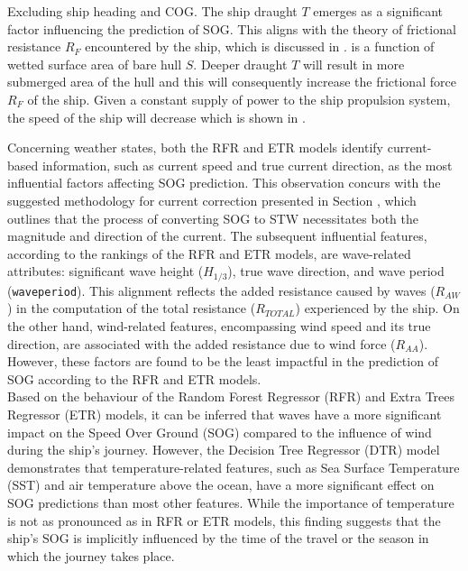 

Excluding ship heading and COG. The ship draught $T$ emerges as a significant factor influencing the prediction of SOG. This aligns with the theory of frictional resistance $R_F$ encountered by the ship, which is discussed in .  is a function of wetted surface area of bare hull $S$. Deeper draught $T$ will result in more submerged area of the hull and this will consequently increase the frictional force $R_F$ of the ship. Given a constant supply of power to the ship propulsion system, the speed of the ship will decrease which is shown in .\\

\pagebreak

Concerning weather states, both the RFR and ETR models identify current-based information, such as current speed and true current direction, as the most influential factors affecting SOG prediction. This observation concurs with the suggested methodology for current correction presented in Section , which outlines that the process of converting SOG to STW necessitates both the magnitude and direction of the current. The subsequent influential features, according to the rankings of the RFR and ETR models, are wave-related attributes: significant wave height ($H_{1/3}$), true wave direction, and wave period ({\tt waveperiod}). This alignment reflects the added resistance caused by waves ($R_{AW}$) in the computation of the total resistance ($R_{TOTAL}$) experienced by the ship. On the other hand, wind-related features, encompassing wind speed and its true direction, are associated with the added resistance due to wind force ($R_{AA}$). However, these factors are found to be the least impactful in the prediction of SOG according to the RFR and ETR models.\\

Based on the behaviour of the Random Forest Regressor (RFR) and Extra Trees Regressor (ETR) models, it can be inferred that waves have a more significant impact on the Speed Over Ground (SOG) compared to the influence of wind during the ship's journey. However, the Decision Tree Regressor (DTR) model demonstrates that temperature-related features, such as Sea Surface Temperature (SST) and air temperature above the ocean, have a more significant effect on SOG predictions than most other features. While the importance of temperature is not as pronounced as in RFR or ETR models, this finding suggests that the ship's SOG is implicitly influenced by the time of the travel or the season in which the journey takes place.\\

